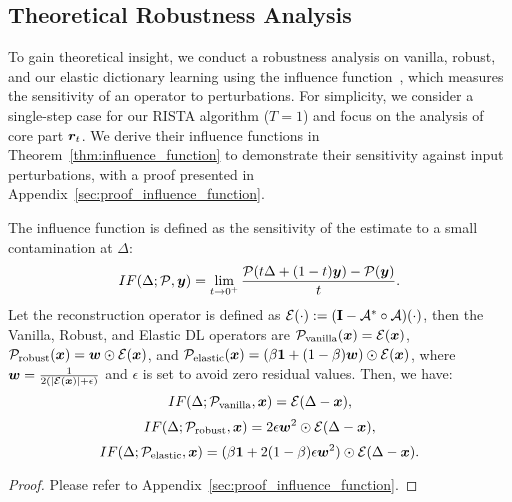 




\subsection{Theoretical Robustness Analysis}
\label{sec:analysis}

To gain theoretical insight, we conduct a robustness analysis on vanilla, robust, and our elastic dictionary learning using the influence function~\citep{law1986robust}, which measures the sensitivity of an operator to perturbations.
For simplicity, we consider a single-step case for our RISTA algorithm ($T=1$) and focus on the analysis of core part ${\bm{r}}_t$. 
We derive 
their influence functions 
in Theorem~\ref{thm:influence_function} to demonstrate their sensitivity against input perturbations, with a proof presented in Appendix~\ref{sec:proof_influence_function}.     


\begin{theorem}
\label{thm:influence_function} 

The influence function is defined as the sensitivity of the estimate to a small contamination at $\Delta$:
\[
IF( \Delta ; {\mathcal{P}}, {\bm{y}}) = \lim_{t\to 0^+} \frac{{\mathcal{P}}(t\Delta + (1-t){\bm{y}}) - {\mathcal{P}}({\bm{y}})}{t}.
\]
Let the reconstruction operator is defined as ${\mathcal{E}}(\cdot):=(\mathbf{I}-{\mathcal{A}}^*\circ{\mathcal{A}})(\cdot)$, then the Vanilla, Robust, and Elastic DL operators are 
 ${\mathcal{P}}_{\text{vanilla}}({\bm{x}})={\mathcal{E}}({\bm{x}})$, ${\mathcal{P}}_{\text{robust}}({\bm{x}}) = {\bm{w}}\odot{\mathcal{E}}({\bm{x}})$, and ${\mathcal{P}}_{\text{elastic}}({\bm{x}}) =\left(\beta \mathbf{1} + (1-\beta) {\bm{w}}\right)\odot{\mathcal{E}}({\bm{x}})$, where ${\bm{w}}=\frac{1}{2(|{\mathcal{E}}({\bm{x}})|+\epsilon)}$ and $\epsilon$ is set to avoid zero residual values.
Then, we have:
\vspace{-0.1in}
\[
IF(\Delta; {\mathcal{P}}_{\text{vanilla}}, {\bm{x}}) = {\mathcal{E}}(\Delta-{\bm{x}}),
\] 
\[
IF(\Delta; {\mathcal{P}}_{\text{robust}}, {\bm{x}}) = 2\epsilon {\bm{w}}^2 \odot {\mathcal{E}}(\Delta-{\bm{x}}),
\]
\[
IF(\Delta; {\mathcal{P}}_{\text{elastic}}, {\bm{x}}) = (\beta \mathbf{1} + 2(1-\beta)\epsilon {\bm{w}}^2) \odot {\mathcal{E}}(\Delta-{\bm{x}}). \]
\end{theorem}
\begin{proof}
    Please refer to Appendix~\ref{sec:proof_influence_function}.
\end{proof}


